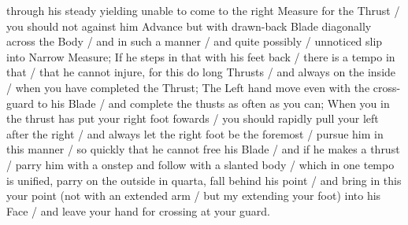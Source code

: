 \newpage


\newpage



through his steady yielding unable to come to the right Measure for
the Thrust / you should not against him Advance but with drawn-back
Blade diagonally across the Body / and in such a manner / and quite
possibly / unnoticed slip into Narrow Measure; If he steps in that
with his feet back / there is a tempo in that / that he cannot injure,
for this do long Thrusts / and always on the inside / when you have
completed the Thrust; The Left hand move even with the cross-guard to
his Blade / and complete the thusts as often as you can; When you in
the thrust has put your right foot fowards / you should rapidly pull
your left after the right / and always let the right foot be the
foremost / pursue him in this manner / so quickly that he cannot free
his Blade / and if he makes a thrust / parry him with a onstep and
follow with a slanted body / which in one tempo is unified, parry on
the outside in quarta, fall behind his point / and bring in this your
point (not with an extended arm / but my extending your foot) into his
Face / and leave your hand for crossing at your guard.


